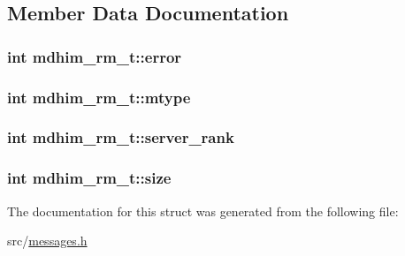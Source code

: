 \subsection{Member Data Documentation}
\hypertarget{structmdhim__rm__t_af7305ef9c55d3d60b91610408a88893f}{
\subsubsection[{error}]{\setlength{\rightskip}{0pt plus 5cm}int mdhim\-\_\-rm\-\_\-t\-::error}}\label{d2/d0c/structmdhim__rm__t_af7305ef9c55d3d60b91610408a88893f}
\hypertarget{structmdhim__rm__t_ad4fc1bc6965fe36cf6bef6c2813dba8d}{
\subsubsection[{mtype}]{\setlength{\rightskip}{0pt plus 5cm}int mdhim\-\_\-rm\-\_\-t\-::mtype}}\label{d2/d0c/structmdhim__rm__t_ad4fc1bc6965fe36cf6bef6c2813dba8d}
\hypertarget{structmdhim__rm__t_a8c6b340ab11d8fb8c7d8540cb59d9246}{
\subsubsection[{server\-\_\-rank}]{\setlength{\rightskip}{0pt plus 5cm}int mdhim\-\_\-rm\-\_\-t\-::server\-\_\-rank}}\label{d2/d0c/structmdhim__rm__t_a8c6b340ab11d8fb8c7d8540cb59d9246}
\hypertarget{structmdhim__rm__t_addf21a3b828da693b9953e4a0d7d0c21}{
\subsubsection[{size}]{\setlength{\rightskip}{0pt plus 5cm}int mdhim\-\_\-rm\-\_\-t\-::size}}\label{d2/d0c/structmdhim__rm__t_addf21a3b828da693b9953e4a0d7d0c21}


The documentation for this struct was generated from the following file\-:\begin{DoxyCompactItemize}
\item 
src/\hyperlink{messages_8h}{messages.\-h}\end{DoxyCompactItemize}
